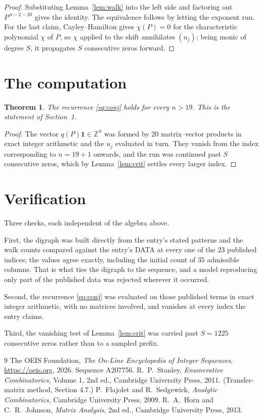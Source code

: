 \documentclass[11pt,a4paper]{article}
\theoremstyle{plain}
\newtheorem{theorem}{Theorem}
\theoremstyle{definition}
\begin{document}
\begin{proof}
Substituting Lemma~\ref{lem:walk} into the left side and factoring out
$P^{\,n-2-20}$ gives the identity. The equivalence follows by letting the exponent
run. For the last claim, Cayley--Hamilton gives $\chi(P)=0$ for the characteristic
polynomial $\chi$ of $P$, so $\chi$ applied to the shift annihilates $(u_j)$; being monic of
degree $S$, it propagates $S$ consecutive zeros forward.
\end{proof}

\section{The computation}

\begin{theorem}
The recurrence \eqref{eq:conj} holds for every $n>19$. This is the statement of
Section~1.
\end{theorem}

\begin{proof}
The vector $q(P)\mathbf{1}\in\mathbb{Z}^{S}$ was formed by $20$ matrix--vector
products in exact integer arithmetic and the $u_j$ evaluated in turn. They vanish from the
index corresponding to $n=19+1$ onwards, and the run was continued past $S$ consecutive
zeros, which by Lemma~\ref{lem:crit} settles every larger index.
\end{proof}

\section{Verification}

Three checks, each independent of the algebra above.

First, the digraph was built directly from the entry's stated patterns and the walk counts
compared against the entry's DATA at every one of the $23$ published indices; the
values agree exactly, including the initial count of $35$ admissible columns. That is
what ties the digraph to the sequence, and a model reproducing only part of the published
data was rejected wherever it occurred.

Second, the recurrence \eqref{eq:conj} was evaluated on those published terms in exact
integer arithmetic, with no matrices involved, and vanishes at every index the entry claims.

Third, the vanishing test of Lemma~\ref{lem:crit} was carried past $S=1225$ consecutive
zeros rather than to a sampled prefix.

\begin{thebibliography}{9}
 The OEIS Foundation, \emph{The On-Line Encyclopedia of Integer
Sequences}, \url{https://oeis.org}, 2026. Sequence A207756.
 R.~P.~Stanley, \emph{Enumerative Combinatorics}, Volume 1, 2nd ed.,
Cambridge University Press, 2011. (Transfer-matrix method, Section 4.7.)
 P.~Flajolet and R.~Sedgewick, \emph{Analytic Combinatorics}, Cambridge
University Press, 2009.
 R.~A.~Horn and C.~R.~Johnson, \emph{Matrix Analysis}, 2nd ed., Cambridge
University Press, 2013.
\end{thebibliography}
\end{document}
